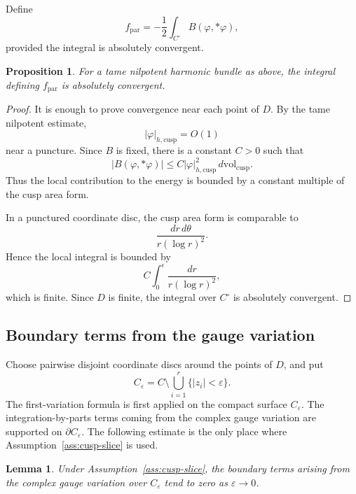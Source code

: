 \documentclass[11pt,reqno]{amsart}
\numberwithin{equation}{section}
\theoremstyle{plain}
\newtheorem{proposition}[theorem]{Proposition}
\newtheorem{lemma}[theorem]{Lemma}
\theoremstyle{definition}
\theoremstyle{remark}
\begin{document}
Define
\[
        f_{\mathrm{par}}
        =
        -\frac12\int_{C^\circ}B(\varphi,*\varphi),
\]
provided the integral is absolutely convergent.

\begin{proposition}
\label{prop:finite-energy}
For a tame nilpotent harmonic bundle as above, the integral defining
\(f_{\mathrm{par}}\) is absolutely convergent.
\end{proposition}

\begin{proof}
It is enough to prove convergence near each point of \(D\). By the tame
nilpotent estimate,
\[
        |\varphi|_{h,\mathrm{cusp}}=O(1)
\]
near a puncture. Since \(B\) is fixed, there is a constant \(C>0\) such that
\[
        |B(\varphi,*\varphi)|
        \leq
        C|\varphi|_{h,\mathrm{cusp}}^2\,d\mathrm{vol}_{\mathrm{cusp}}.
\]
Thus the local contribution to the energy is bounded by a constant multiple of
the cusp area form.

In a punctured coordinate disc, the cusp area form is comparable to
\[
        \frac{dr\,d\theta}{r(\log r)^2}.
\]
Hence the local integral is bounded by
\[
        C\int_0^\epsilon \frac{dr}{r(\log r)^2},
\]
which is finite. Since \(D\) is finite, the integral over \(C^\circ\) is
absolutely convergent.
\end{proof}


\subsection{Boundary terms from the gauge variation}

Choose pairwise disjoint coordinate discs around the points of \(D\), and put
\[
        C_\varepsilon
        =
        C\setminus\bigcup_{i=1}^{r}\{|z_i|<\varepsilon\}.
\]
The first-variation formula is first applied on the compact surface
\(C_\varepsilon\).  The integration-by-parts terms coming from the complex gauge
variation are supported on \(\partial C_\varepsilon\).  The following estimate
is the only place where Assumption~\ref{ass:cusp-slice} is used.

\begin{lemma}
\label{lem:gauge-boundary}
Under Assumption~\ref{ass:cusp-slice}, the boundary terms arising from the
complex gauge variation over \(C_\varepsilon\) tend to zero as
\(\varepsilon\to0\).
\end{lemma}
\end{document}

